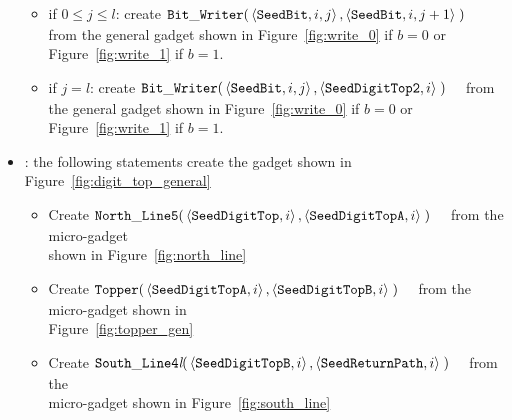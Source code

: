\begin{itemize}
\begin{itemize}
        \item if $0 \leqslant j \leqslant l$: create
        $\begin{aligned}[t]
            {\tt Bit\_Writer}(&\left\langle {\tt SeedBit}, i, j \right\rangle, \left\langle {\tt SeedBit}, i, j + 1 \right\rangle \;)
        \end{aligned}$ from the general gadget shown in Figure~\ref{fig:write_0} if $b = 0$ or Figure~\ref{fig:write_1} if $b = 1$.

        \item if $j = l$: create
        $\begin{aligned}[t]
            {\tt Bit\_Writer}(&\left\langle {\tt SeedBit}, i, j \right\rangle, \left\langle {\tt SeedDigitTop2}, i \right\rangle \;)
        \end{aligned}$ from the general gadget shown in Figure~\ref{fig:write_0} if $b = 0$ or Figure~\ref{fig:write_1} if $b = 1$.
    \end{itemize}

    \item {\dtop}: the following statements create the gadget shown in Figure~\ref{fig:digit_top_general}
    \begin{itemize}
        \item Create
        $\begin{aligned}[t]
            {\tt North\_Line5}(&\left\langle {\tt SeedDigitTop},  i \right\rangle,
                                \left\langle {\tt SeedDigitTopA}, i \right\rangle \;)
        \end{aligned}$ from the micro-gadget\\shown in Figure~\ref{fig:north_line}

        \item Create
        $\begin{aligned}[t]
            {\tt Topper}(&\left\langle {\tt SeedDigitTopA}, i \right\rangle,
                          \left\langle {\tt SeedDigitTopB}, i \right\rangle \;)
        \end{aligned}$ from the micro-gadget shown in\\ Figure~\ref{fig:topper_gen}

        \item Create
        $\begin{aligned}[t]
            {\tt South\_Line4\textit{l}}(&\left\langle {\tt SeedDigitTopB},  i \right\rangle,
                                          \left\langle {\tt SeedReturnPath}, i \right\rangle \;)
        \end{aligned}$ from the\\micro-gadget shown in Figure~\ref{fig:south_line}
    \end{itemize}


\end{itemize}
